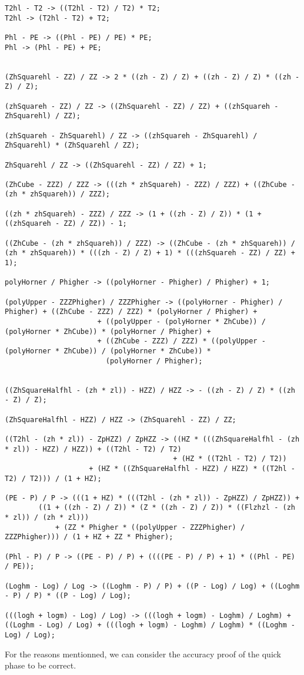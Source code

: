 \begin{lstlisting}[caption={Gappa term rewriting hints in file {\tt log-td-E0-logir0.gappa}},firstnumber=81]
T2hl - T2 -> ((T2hl - T2) / T2) * T2;
T2hl -> (T2hl - T2) + T2;

Phl - PE -> ((Phl - PE) / PE) * PE;
Phl -> (Phl - PE) + PE;


(ZhSquarehl - ZZ) / ZZ -> 2 * ((zh - Z) / Z) + ((zh - Z) / Z) * ((zh - Z) / Z);

(zhSquareh - ZZ) / ZZ -> ((ZhSquarehl - ZZ) / ZZ) + ((zhSquareh - ZhSquarehl) / ZZ);

(zhSquareh - ZhSquarehl) / ZZ -> ((zhSquareh - ZhSquarehl) / ZhSquarehl) * (ZhSquarehl / ZZ);

ZhSquarehl / ZZ -> ((ZhSquarehl - ZZ) / ZZ) + 1;

(ZhCube - ZZZ) / ZZZ -> (((zh * zhSquareh) - ZZZ) / ZZZ) + ((ZhCube - (zh * zhSquareh)) / ZZZ);

((zh * zhSquareh) - ZZZ) / ZZZ -> (1 + ((zh - Z) / Z)) * (1 + ((zhSquareh - ZZ) / ZZ)) - 1;

((ZhCube - (zh * zhSquareh)) / ZZZ) -> ((ZhCube - (zh * zhSquareh)) / (zh * zhSquareh)) * (((zh - Z) / Z) + 1) * (((zhSquareh - ZZ) / ZZ) + 1);

polyHorner / Phigher -> ((polyHorner - Phigher) / Phigher) + 1;

(polyUpper - ZZZPhigher) / ZZZPhigher -> ((polyHorner - Phigher) / Phigher) + ((ZhCube - ZZZ) / ZZZ) * (polyHorner / Phigher) + 
					  + ((polyUpper - (polyHorner * ZhCube)) / (polyHorner * ZhCube)) * (polyHorner / Phigher) +
					  + ((ZhCube - ZZZ) / ZZZ) * ((polyUpper - (polyHorner * ZhCube)) / (polyHorner * ZhCube)) * 
					    (polyHorner / Phigher);


((ZhSquareHalfhl - (zh * zl)) - HZZ) / HZZ -> - ((zh - Z) / Z) * ((zh - Z) / Z);

(ZhSquareHalfhl - HZZ) / HZZ -> (ZhSquarehl - ZZ) / ZZ;

((T2hl - (zh * zl)) - ZpHZZ) / ZpHZZ -> ((HZ * (((ZhSquareHalfhl - (zh * zl)) - HZZ) / HZZ)) + ((T2hl - T2) / T2) 
                                        + (HZ * ((T2hl - T2) / T2)) 
					+ (HZ * ((ZhSquareHalfhl - HZZ) / HZZ) * ((T2hl - T2) / T2))) / (1 + HZ);

(PE - P) / P -> (((1 + HZ) * (((T2hl - (zh * zl)) - ZpHZZ) / ZpHZZ)) +
		((1 + ((zh - Z) / Z)) * (Z * ((zh - Z) / Z)) * ((Flzhzl - (zh * zl)) / (zh * zl))) 
	        + (ZZ * Phigher * ((polyUpper - ZZZPhigher) / ZZZPhigher))) / (1 + HZ + ZZ * Phigher);

(Phl - P) / P -> ((PE - P) / P) + ((((PE - P) / P) + 1) * ((Phl - PE) / PE));

(Loghm - Log) / Log -> ((Loghm - P) / P) + ((P - Log) / Log) + ((Loghm - P) / P) * ((P - Log) / Log);

(((logh + logm) - Log) / Log) -> (((logh + logm) - Loghm) / Loghm) + ((Loghm - Log) / Log) + (((logh + logm) - Loghm) / Loghm) * ((Loghm - Log) / Log);
\end{lstlisting}
For the reasons mentionned, we can consider the accuracy proof of the quick phase to be correct.
